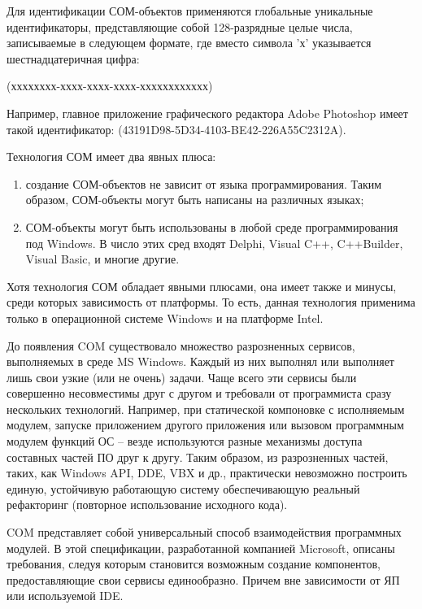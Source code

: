 Для идентификации СОМ-объектов применяются глобальные уникальные идентификаторы, представляющие собой 128-разрядные целые числа, записываемые в следующем формате, где вместо символа 'х' указывается шестнадцатеричная цифра: 

(хххххххх-хххх-хххх-хххх-хххххххххххх)

\begin{example}
  Например, главное приложение графического редактора Adobe Photoshop имеет такой идентификатор: (43191D98-5D34-4103-BE42-226A55C2312A).
\end{example}

\begin{utv}
  Технология СОМ имеет два явных плюса:
  \begin{enumerate}
    \item создание СОМ-объектов не зависит от языка программирования. Таким образом, СОМ-объекты могут быть написаны на различных языках;
    \item СОМ-объекты могут быть использованы в любой среде программирования под Windows. В число этих сред входят Delphi, Visual C++, C++Builder, Visual Basic, и многие другие.
  \end{enumerate}
\end{utv}

\begin{note}
  Хотя технология СОМ обладает явными плюсами, она имеет также и минусы, среди которых зависимость от платформы. То есть, данная технология применима только в операционной системе Windows и на платформе Intel.
\end{note}

До появления COM существовало множество разрозненных сервисов, выполняемых в среде MS Windows. Каждый из них выполнял или выполняет лишь свои узкие (или не очень) задачи. Чаще всего эти сервисы были совершенно несовместимы друг с другом и требовали от программиста сразу нескольких технологий. Например, при статической компоновке с исполняемым модулем, запуске приложением другого приложения или вызовом программным модулем функций ОС – везде используются разные механизмы доступа составных частей ПО друг к другу. Таким образом, из разрозненных частей, таких, как Windows API, DDE, VBX и др., практически невозможно построить единую, устойчивую работающую систему обеспечивающую реальный рефакторинг (повторное использование исходного кода).

COM представляет собой универсальный способ взаимодействия программных модулей. В этой спецификации, разработанной компанией Microsoft, описаны требования, следуя которым становится возможным создание компонентов, предоставляющие свои сервисы единообразно. Причем вне зависимости от ЯП или используемой IDE. 

